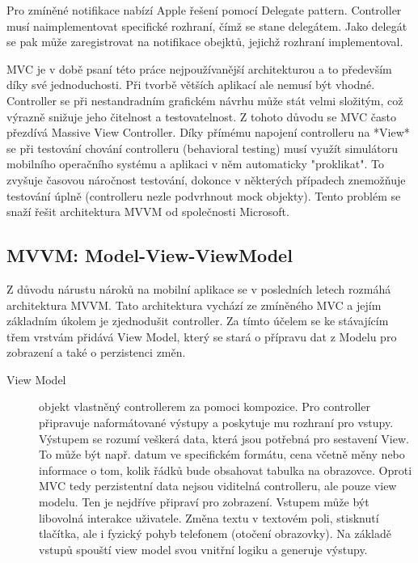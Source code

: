 Pro zmíněné notifikace nabízí Apple řešení pomocí Delegate pattern.
Controller musí naimplementovat specifické rozhraní, čímž se stane delegátem.
Jako delegát se pak může zaregistrovat na notifikace obejktů, jejichž rozhraní implementoval.

MVC je v době psaní této práce nejpoužívanější architekturou a to především díky své jednoduchosti.
Při tvorbě větších aplikací ale nemusí být vhodné.
Controller se při nestandradním grafickém návrhu může stát velmi složitým, což výrazně snižuje jeho čitelnost a testovatelnost.
Z tohoto důvodu se MVC často přezdívá Massive View Controller.
Díky přímému napojení controlleru na *View* se při testování chování controlleru (behavioral testing) musí využít simulátoru mobilního operačního systému a aplikaci v něm automaticky "proklikat".
To zvyšuje časovou náročnost testování, dokonce v některých případech znemožňuje testování úplně (controlleru nezle podvrhnout mock objekty).
Tento problém se snaží řešit architektura MVVM od společnosti Microsoft.


\subsection{MVVM: Model-View-ViewModel}

Z důvodu nárustu nároků na mobilní aplikace se v posledních letech rozmáhá architektura MVVM.
Tato architektura vychází ze zmíněného MVC a jejím základním úkolem je zjednodušit controller.
Za tímto účelem se ke stávajícím třem vrstvám přidává View Model, který se stará o přípravu dat z Modelu pro zobrazení a také o perzistenci změn.

\begin{description}
  \item[View Model] objekt vlastněný controllerem za pomoci kompozice.
  Pro controller připravuje naformátované výstupy a poskytuje mu rozhraní pro vstupy.
  Výstupem se rozumí veškerá data, která jsou potřebná pro sestavení View.
  To může být např. datum ve specifickém formátu, cena včetně měny nebo informace o tom, kolik řádků bude obsahovat tabulka na obrazovce.
  Oproti MVC tedy perzistentní data nejsou viditelná controlleru, ale pouze view modelu.
  Ten je nejdříve připraví pro zobrazení.
  Vstupem může být libovolná interakce uživatele.
  Změna textu v textovém poli, stisknutí tlačítka, ale i fyzický pohyb telefonem (otočení obrazovky).
  Na základě vstupů spouští view model svou vnitřní logiku a generuje výstupy.
\end{description}

